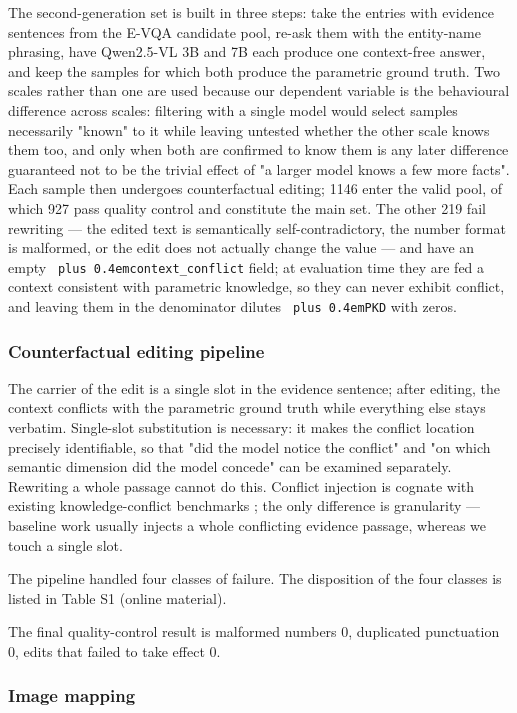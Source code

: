 \documentclass[pdflatex,sn-basic,Numbered]{sn-jnl}
\theoremstyle{thmstyleone}
\theoremstyle{thmstyletwo}
\theoremstyle{thmstylethree}
\DeclareRobustCommand{\code}[1]{\texttt{\spaceskip=0pt plus 0.4em\relax#1}}
\begin{document}
The second-generation set is built in three steps: take the entries with evidence sentences
from the E-VQA candidate pool, re-ask them with the entity-name phrasing, have Qwen2.5-VL 3B and
7B each produce one context-free answer, and keep the samples for which both produce the
parametric ground truth. Two scales rather than one are used because our dependent variable is
the behavioural difference across scales: filtering with a single model would select samples
necessarily "known" to it while leaving untested whether the other scale knows them too, and
only when both are confirmed to know them is any later difference guaranteed not to be the
trivial effect of "a larger model knows a few more facts". Each sample then undergoes
counterfactual editing; 1146 enter the valid pool, of which 927 pass quality control and
constitute the main set. The other 219 fail rewriting — the edited text is semantically
self-contradictory, the number format is malformed, or the edit does not actually change the
value — and have an empty \code{context\_conflict} field; at evaluation time they are fed a context
consistent with parametric knowledge, so they can never exhibit conflict, and leaving them in
the denominator dilutes \code{PKD} with zeros.

\subsubsection{Counterfactual editing pipeline}
\label{sec:4-1-3}

The carrier of the edit is a single slot in the evidence sentence; after editing, the context
conflicts with the parametric ground truth while everything else stays verbatim. Single-slot
substitution is necessary: it makes the conflict location precisely identifiable, so that "did
the model notice the conflict" and "on which semantic dimension did the model concede" can be
examined separately. Rewriting a whole passage cannot do this. Conflict injection is cognate
with existing knowledge-conflict benchmarks \cite{ref19,ref21}; the only difference is granularity —
baseline work usually injects a whole conflicting evidence passage, whereas we touch a single
slot.

The pipeline handled four classes of failure. The disposition of the four classes is listed in
Table S1 (online material).

The final quality-control result is malformed numbers 0, duplicated punctuation 0, edits that
failed to take effect 0.

\subsubsection{Image mapping}
\label{sec:4-1-4}
\end{document}
